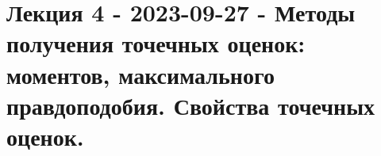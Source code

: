 \section{Лекция 4 - 2023-09-27 - Методы получения точечных оценок: моментов, максимального
правдоподобия. Свойства точечных оценок.}






